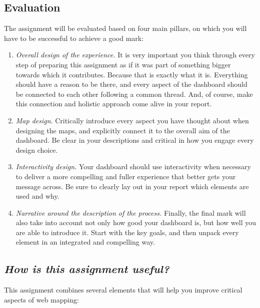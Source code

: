 \documentclass[
  letterpaper,
  DIV=11,
  numbers=noendperiod]{scrreprt}
\providecommand{\tightlist}{%
  \setlength{\itemsep}{0pt}\setlength{\parskip}{0pt}}\usepackage{longtable,booktabs,array}
\begin{document}
\hypertarget{evaluation}{%
\subsection*{Evaluation}\label{evaluation}}

The assignment will be evaluated based on four main pillars, on which
you will have to be successful to achieve a good mark:

\begin{enumerate}
\def\labelenumi{\arabic{enumi}.}
\tightlist
\item
  \emph{Overall design of the experience.} It is very important you
  think through every step of preparing this assignment as if it was
  part of something bigger towards which it contributes. Because that is
  exactly what it is. Everything should have a reason to be there, and
  every aspect of the dashboard should be connected to each other
  following a common thread. And, of course, make this connection and
  holistic approach come alive in your report.
\item
  \emph{Map design}. Critically introduce every aspect you have thought
  about when designing the maps, and explicitly connect it to the
  overall aim of the dashboard. Be clear in your descriptions and
  critical in how you engage every design choice.
\item
  \emph{Interactivity design.} Your dashboard should use interactivity
  when necessary to deliver a more compelling and fuller experience that
  better gets your message across. Be sure to clearly lay out in your
  report which elements are used and why.
\item
  \emph{Narrative around the description of the process.} Finally, the
  final mark will also take into account not only how good your
  dashboard is, but how well you are able to introduce it. Start with
  the key goals, and then unpack every element in an integrated and
  compelling way.
\end{enumerate}

\hypertarget{how-is-this-assignment-useful-1}{%
\subsection*{\texorpdfstring{\emph{How is this assignment
useful?}}{How is this assignment useful?}}\label{how-is-this-assignment-useful-1}}

This assignment combines several elements that will help you improve
critical aspects of web mapping:
\end{document}

